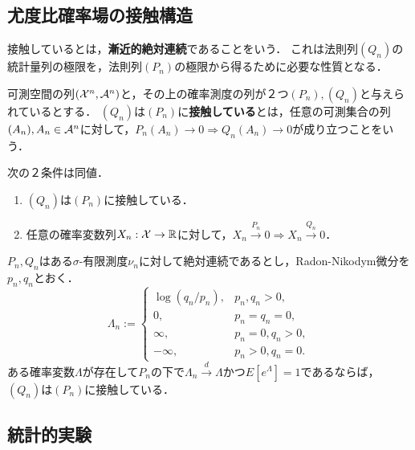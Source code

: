 \documentclass[uplatex,dvipdfmx]{jsreport}
\begin{document}
\subsection{尤度比確率場の接触構造}

\begin{tcolorbox}[colframe=ForestGreen, colback=ForestGreen!10!white,breakable,colbacktitle=ForestGreen!40!white,coltitle=black,fonttitle=\bfseries\sffamily,
title=]
    接触しているとは，\textbf{漸近的絶対連続}であることをいう．
    これは法則列$(Q_n)$の統計量列の極限を，法則列$(P_n)$の極限から得るために必要な性質となる．
\end{tcolorbox}

\begin{definition}[contiguous]
    可測空間の列$(\mathcal{X}^n,\mathcal{A}^n)$と，その上の確率測度の列が２つ$(P_n),(Q_n)$と与えられているとする．
    $(Q_n)$は$(P_n)$に\textbf{接触している}とは，任意の可測集合の列$(A_n),A_n\in\mathcal{A}^n$に対して，$P_n(A_n)\to0\Rightarrow Q_n(A_n)\to0$が成り立つことをいう．
\end{definition}

\begin{lemma}[接触性の特徴付け]
    次の２条件は同値．
    \begin{enumerate}
        \item $(Q_n)$は$(P_n)$に接触している．
        \item 任意の確率変数列$X_n:\mathcal{X}\to\mathbb{R}$に対して，$X_n\xrightarrow{P_n}0\Rightarrow X_n\xrightarrow{Q_n}0$．
    \end{enumerate}
\end{lemma}

\begin{theorem}[接触性の十分条件]
    $P_n,Q_n$はある$\sigma$-有限測度$\nu_n$に対して絶対連続であるとし，Radon-Nikodym微分を$p_n,q_n$とおく．
    \[\Lambda_n:=\begin{cases}
        \log(q_n/p_n),&p_n,q_n>0,\\
        0,&p_n=q_n=0,\\
        \infty,&p_n=0,q_n>0,\\
        -\infty,&p_n>0,q_n=0.
    \end{cases}\]
    ある確率変数$\Lambda$が存在して$P_n$の下で$\Lambda_n\xrightarrow{d}\Lambda$かつ$E[e^\Lambda]=1$であるならば，$(Q_n)$は$(P_n)$に接触している．
\end{theorem}

\subsection{統計的実験}
\end{document}
